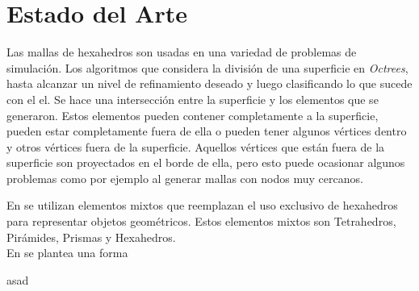 \section{Estado del Arte}

Las mallas de hexahedros son usadas en una variedad de problemas de simulación. Los algoritmos que  considera la división de una superficie en \textit{Octrees}, hasta alcanzar un nivel de refinamiento deseado y luego clasificando lo que sucede con el el. Se hace una intersección entre la superficie y los elementos que se generaron. Estos elementos pueden contener completamente a la superficie, pueden estar completamente fuera de ella o pueden tener algunos vértices dentro y otros vértices fuera de la superficie. Aquellos vértices que están fuera de la superficie son proyectados en el borde de ella, pero esto puede ocasionar algunos problemas como por ejemplo al generar mallas con nodos muy cercanos.

En \cite{Lobos2013a} se utilizan elementos mixtos que reemplazan el uso exclusivo de hexahedros para representar objetos geométricos. Estos elementos mixtos son Tetrahedros, Pirámides, Prismas y Hexahedros.\\


En \cite{Kobbelt2001} se plantea una forma



\cite{Kobbelt2001}asad 
